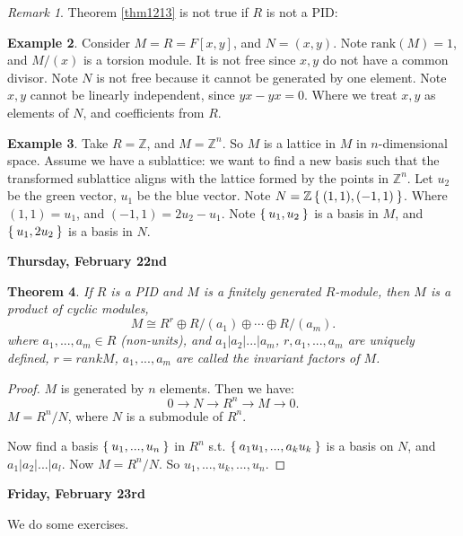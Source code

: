 \documentclass[12pt]{amsbook}
\theoremstyle{plain}
\newtheorem{theorem}{Theorem}[chapter]
\numberwithin{section}{chapter}
\numberwithin{equation}{chapter}
\theoremstyle{definition}
\newtheorem{Ex}[theorem]{Example}
\theoremstyle{remark}
\newtheorem{rem}[theorem]{Remark}
\newcommand{\z}{\mathbb{Z}}
\newcommand{\rank}{\text{rank}}
\begin{document}
\begin{rem}
Theorem \ref{thm1213} is not true if $R$ is not a PID:
\end{rem}

\begin{Ex}
Consider $M = R = F[x,y]$, and $N = (x,y)$. Note $\rank (M) = 1$, and $M/(x)$ is a torsion module. It is not free since $x,y$ do not have a common divisor. Note $N$ is not free because it cannot be generated by one element. Note $x,y$ cannot be linearly independent, since $yx - yx = 0$. Where we treat $x,y$ as elements of $N$, and coefficients from $R$. 
\end{Ex}

\begin{Ex}
Take $R = \z$, and $M = \z^n$. So $M$ is a lattice in $M$ in $n$-dimensional space. Assume we have a sublattice: we want to find a new basis such that the transformed sublattice aligns with the lattice formed by the points in $\z^n$. Let $u_2$ be the green vector, $u_1$ be the blue vector. Note $N = \z\Set{(1,1),(-1,1)}$. Where $(1,1) = u_1$, and $(-1,1) = 2u_2 - u_1$. Note $\Set{u_1,u_2}$ is a basis in $M$, and $\Set{u_1,2u_2}$ is a basis in $N$. 
\end{Ex}

\textbf{Thursday, February 22nd}

\begin{theorem}
If $R$ is a PID and $M$ is a finitely generated $R$-module, then $M$ is a product of cyclic modules, 
$$
M \cong R^r \oplus R/(a_1) \oplus \cdots \oplus R/(a_m).
$$
where $a_1,...,a_m \in R$ (non-units), and $a_1|a_2|...|a_m$,
 $r,a_1,...,a_m$ are uniquely defined, $r = rank M$, $a_1,...,a_m$ are called the invariant factors of $M$. 
\end{theorem}

\begin{proof}
$M$ is generated by $n$ elements. Then we have:
$$
0 \to N \to R^n \to M \to 0.
$$
$M = R^n/N$, where $N$ is a submodule of $R^n$. 

Now find a basis $\Set{u_1,...,u_n}$ in $R^n$ s.t. $\Set{a_1u_1,...,a_ku_k}$ is a basis on $N$, and $a_1|a_2|...|a_l$. Now $M = R^n/N$. So $u_1,...,u_k,...,u_n$. 
\end{proof}

\textbf{Friday, February 23rd}

We do some exercises. 
\end{document}
